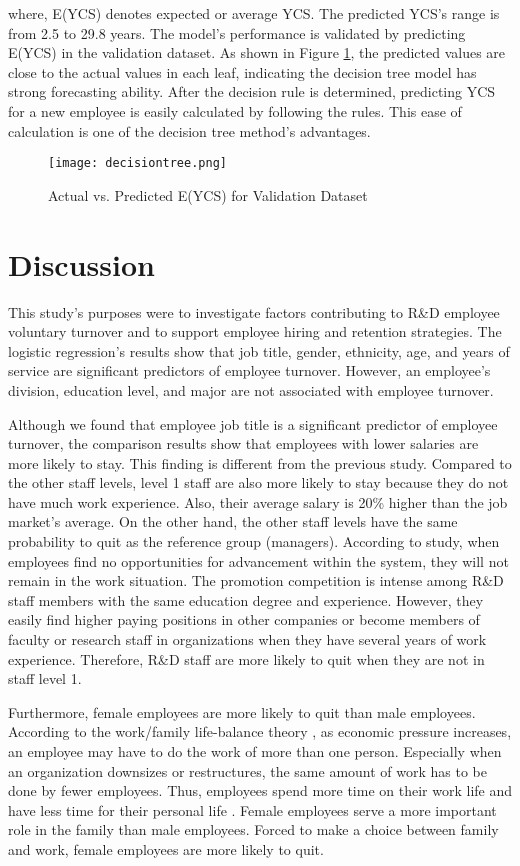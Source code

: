 where, E(YCS) denotes expected or average YCS. The predicted YCS's range is from 2.5 to 29.8 years. The model's performance is validated by predicting E(YCS) in the validation dataset. As shown in Figure \ref{fig:decsiontree}, the predicted values are close to the actual values in each leaf, indicating the decision tree model has strong forecasting ability. After the decision rule is determined, predicting YCS for a new employee is easily calculated by following the rules. This ease of calculation is one of the decision tree method's advantages. 

\begin{figure}
	\centering
	\texttt{[image: decisiontree.png]}
	\caption{Actual vs. Predicted E(YCS) for Validation Dataset}
	\label{fig:decsiontree}
\end{figure}
\section{Discussion}
This study's purposes were to investigate factors contributing to R\&D employee voluntary turnover and to support employee hiring and retention strategies. The logistic regression's results show that job title, gender, ethnicity, age, and years of service are significant predictors of employee turnover. However, an employee's division, education level, and major are not associated with employee turnover. 

Although we found that employee job title is a significant predictor of employee turnover, the comparison results show that employees with lower salaries are more likely to stay. This finding is different from the previous study. Compared to the other staff levels, level 1 staff are also more likely to stay because they do not have much work experience. Also, their average salary is 20\% higher than the job market's average. On the other hand, the other staff levels have the same probability to quit as the reference group (managers). According to \citet{RN37} study, when employees find no opportunities for advancement within the system, they will not remain in the work situation. The promotion competition is intense among R\&D staff members with the same education degree and experience. However, they easily find higher paying positions in other companies or become members of faculty or research staff in organizations when they have several years of work experience. Therefore, R\&D staff are more likely to quit when they are not in staff level 1.  

Furthermore, female employees are more likely to quit than male employees. According to the work/family life-balance theory \citep{RN38}, as economic pressure increases, an employee may have to do the work of more than one person. Especially when an organization downsizes or restructures, the same amount of work has to be done by fewer employees. Thus, employees spend more time on their work life and have less time for their personal life \citep{smith2009}. Female employees serve a more important role in the family than male employees. Forced to make a choice between family and work, female employees are more likely to quit. 


